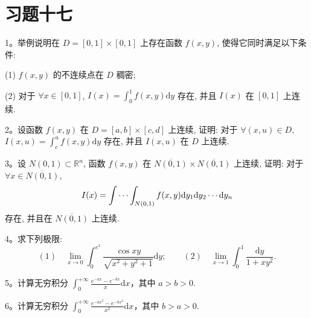 \section*{习题十七}
{}
\label{exercises:ma-17}

1。举例说明在 $D=[0,1]\times[0,1]$ 上存在函数 $f(x,y)$, 使得它同时满足以下条件:

(1) $f(x,y)$ 的不连续点在 $D$ 稠密;

(2) 对于 $\forall x\in[0,1]$, $I(x)=\int_0^1f(x,y)\mathrm dy$ 存在, 并且 $I(x)$ 在 $[0,1]$ 上连续.

2。设函数 $f(x,y)$ 在 $D=[a,b]\times[c,d]$ 上连续, 证明: 对于 $\forall(x,u)\in D$, $I(x,u)=\int_c^u f(x,y)\mathrm dy$ 存在, 并且 $I(x,u)$ 在 $D$ 上连续.

3。设 $N(0,1)\subset\mathbb R^n$, 函数 $f(x,y)$ 在 $\overline{N(0,1)}\times\overline{N(0,1)}$ 上连续, 证明: 对于 $\forall x\in\overline{N(0,1)}$,
\[
  I(x)=\idotsint_{N(0,1)}f(x,y)\mathrm dy_1\mathrm dy_2\cdots\mathrm dy_n
\]
存在, 并且在 $\overline{N(0,1)}$ 上连续.

4。求下列极限:
\[
  (1)\quad \lim_{x\to0}\int_0^{e^x}\frac{\cos xy}{\sqrt{x^2+y^2+1}}\mathrm dy;
  \qquad
  (2)\quad \lim_{x\to1}\int_0^1\frac{\mathrm dy}{1+xy^2}.
\]

5。计算无穷积分 $\displaystyle\int_0^{+\infty}\frac{e^{-ax}-e^{-bx}}{x}\mathrm dx$，其中 $a>b>0$.

6。计算无穷积分 $\displaystyle\int_0^{+\infty}\frac{e^{-ax^2}-e^{-bx^2}}{x^2}\mathrm dx$，其中 $b>a>0$.



